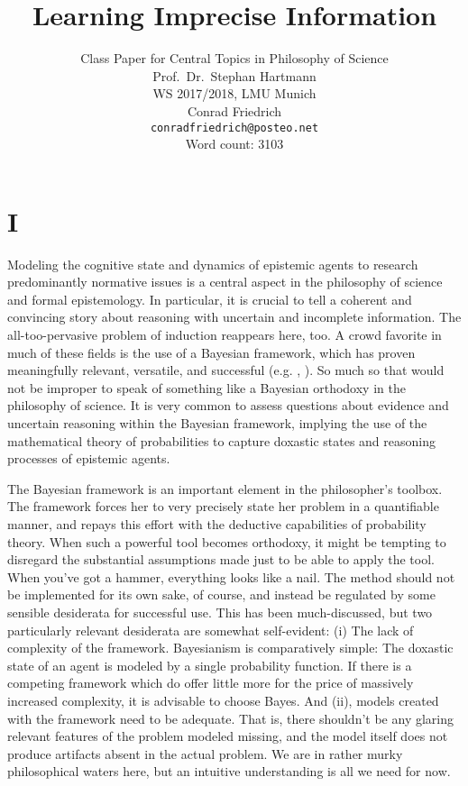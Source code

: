 \documentclass[11pt, a4paper]{scrartcl}
\title{\osfamily{}Learning Imprecise Information}
\author{Class Paper for Central Topics in Philosophy of Science \\ Prof.\ Dr.\ Stephan Hartmann \\ WS 2017/2018, LMU Munich \\ Conrad Friedrich \\ \texttt{conradfriedrich@posteo.net} \\ Word count: 3103}
\begin{document}
\maketitle
\thispagestyle{empty}
\newpage
\section{I}
Modeling the cognitive state and dynamics of epistemic agents to research predominantly normative issues is a central aspect in the philosophy of science and formal epistemology. In particular, it is crucial to tell a coherent and convincing story about reasoning with uncertain and incomplete information. The all-too-pervasive problem of induction reappears here, too. A crowd favorite in much of these fields is the use of a Bayesian framework, which has proven meaningfully relevant, versatile, and successful (e.g. \citet{Bovens2003-HARBE}, \citet{Hartmann2017}). So much so that would not be improper to speak of something like a Bayesian orthodoxy in the philosophy of science. It is very common to assess questions about evidence and uncertain reasoning within the Bayesian framework, implying the use of the mathematical theory of probabilities to capture doxastic states and reasoning processes of epistemic agents.

The Bayesian framework is an important element in the philosopher's toolbox. The framework forces her to very precisely state her problem in a quantifiable manner, and repays this effort with the deductive capabilities of probability theory. When such a powerful tool becomes orthodoxy, it might be tempting to disregard the substantial assumptions made just to be able to apply the tool. When you've got a hammer, everything looks like a nail. The method should not be implemented for its own sake, of course, and instead be regulated by some sensible desiderata for successful use. This has been much-discussed, but two particularly relevant desiderata are somewhat self-evident: (i) The lack of complexity of the framework. Bayesianism is comparatively simple: The doxastic state of an agent is modeled by a single probability function. If there is a competing framework which do offer little more for the price of massively increased complexity, it is advisable to choose Bayes. And (ii), models created with the framework need to be adequate. That is, there shouldn't be any glaring relevant features of the problem modeled missing, and the model itself does not produce artifacts absent in the actual problem. We are in rather murky philosophical waters here, but an intuitive understanding is all we need for now. 
\end{document}
